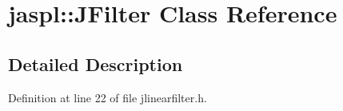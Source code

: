 \hypertarget{classjaspl_1_1_j_filter}{}\section{jaspl\+:\+:J\+Filter Class Reference}
\label{classjaspl_1_1_j_filter}


\subsection{Detailed Description}


Definition at line 22 of file jlinearfilter.\+h.

